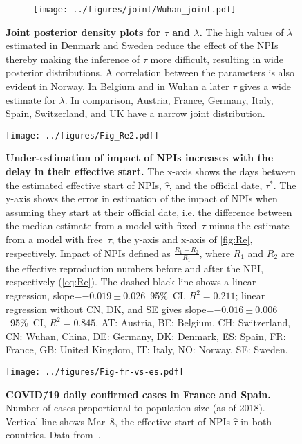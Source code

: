 \documentclass[12pt]{extarticle}
\newcommand{\covid}{COVID\=/19 }
\begin{document}
\begin{figure}[p]
\begin{subfigure}{0.32\textwidth}
        \texttt{[image: ../figures/joint/Wuhan\_joint.pdf]}
    \end{subfigure}
    \caption{
    \textbf{Joint posterior density plots for $\tau$ and $\lambda$.} The high values of $\lambda$ estimated in Denmark and Sweden reduce the effect of the NPIs thereby making the inference of $\tau$ more difficult, resulting in wide posterior distributions. A correlation between the parameters is also evident in Norway. In Belgium and in Wuhan a later $\tau$ gives a wide estimate for $\lambda$. In comparison, Austria, France, Germany, Italy, Spain, Switzerland, and UK have a narrow joint distribution.
    }
    \label{fig:joint}
\end{figure}



\begin{figure}[h]
    \centering
	\texttt{[image: ../figures/Fig\_Re2.pdf]}
    \caption{
    \textbf{Under-estimation of impact of NPIs increases with the delay in their effective start.} The x-axis shows the days between the estimated effective start of NPIs, $\hat\tau$, and the official date, $\tau^*$. The y-axis shows the error in estimation of the impact of NPIs when assuming they start at their official date, i.e. the difference between the median estimate from a model with fixed~$\tau$ minus the estimate from a model with free~$\tau$, the y-axis and x-axis of \autoref{fig:Re}, respectively.
    Impact of NPIs defined as $\frac{R_1 - R_2}{R_1}$, where $R_1$ and $R_2$ are the effective reproduction numbers before and after the NPI, respectively (\autoref{eq:Re}).
	The dashed black line shows a linear regression, slope=$-0.019\pm0.026$~95\%~CI, $R^2=0.211$; linear regression without CN, DK, and SE gives slope=$-0.016 \pm0.006$~95\%~CI, $R^2=0.845$.
	AT: Austria, BE: Belgium, CH: Switzerland, CN: Wuhan, China, DE: Germany, DK: Denmark, ES: Spain, FR: France, GB: United Kingdom, IT: Italy, NO: Norway, SE: Sweden.
    } 
    \label{fig:Re2}
\end{figure}



\begin{figure}[h]
    \centering
	\texttt{[image: ../figures/Fig-fr-vs-es.pdf]}
    \caption{
    \textbf{\covid daily confirmed cases in France and Spain.}
    Number of cases proportional to population size (as of 2018). 
    Vertical line shows Mar~8, the effective start of NPIs $\hat{\tau}$ in both countries.
    Data from~\citet{Flaxman2020}.
    } 
    \label{fig:fig-fr-vs-es}
\end{figure}
\end{document}
